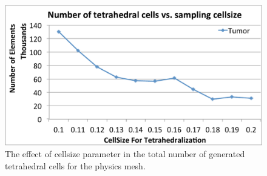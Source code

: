 \begin{figure}[H]
  \centering
  \includegraphics[width=0.8 \linewidth]{figures/deformable/cellsize_elements.pdf}
  \caption{\label{fig:cellsize_elements}
  {The effect of cellsize parameter in the total number of generated tetrahedral cells for the physics mesh.}
}
\end{figure}


 




















